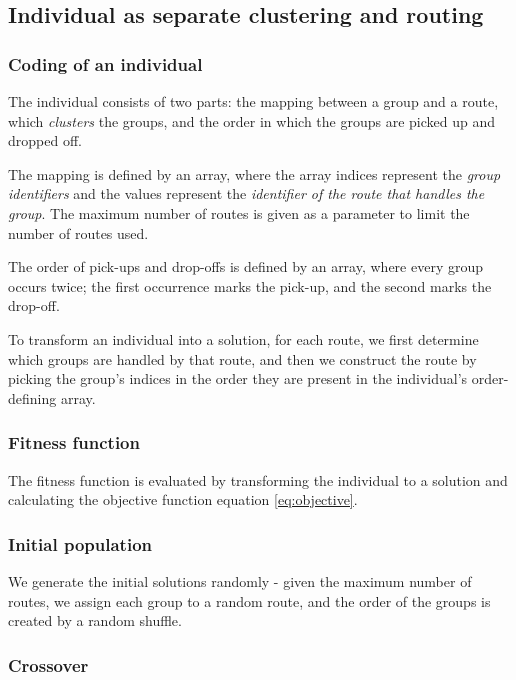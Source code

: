 \subsection{Individual as separate clustering and routing}

\subsubsection{Coding of an individual}

The individual consists of two parts: the mapping between a group and a route, which \textit{clusters} the groups, and the order in which the groups are picked up and dropped off.

The mapping is defined by an array, where the array indices represent the \textit{group identifiers} and the values represent the \textit{identifier of the route that handles the group}. The maximum number of routes is given as a parameter to limit the number of routes used.

The order of pick-ups and drop-offs is defined by an array, where every group occurs twice; the first occurrence marks the pick-up, and the second marks the drop-off.

To transform an individual into a solution, for each route, we first determine which groups are handled by that route, and then we construct the route by picking the group's indices in the order they are present in the individual's order-defining array.

\subsubsection{Fitness function}

The fitness function is evaluated by transforming the individual to a solution and calculating the objective function equation \ref{eq:objective}.

\subsubsection{Initial population}

We generate the initial solutions randomly - given the maximum number of routes, we assign each group to a random route, and the order of the groups is created by a random shuffle.

\subsubsection{Crossover}

